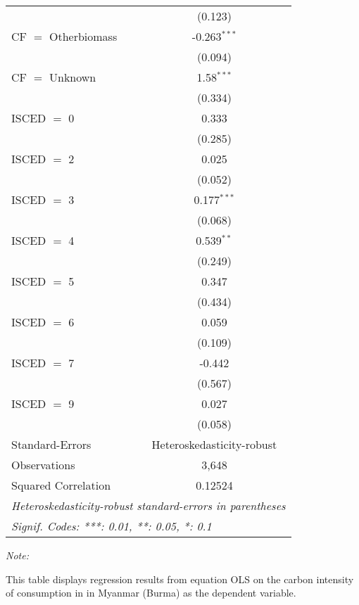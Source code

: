 \begin{table}[htbp!]
\begin{adjustbox}{width = 1\textwidth, max height = 0.95\textheight, center}
\begin{threeparttable}[b]
\begin{tabular}{lc}
                                & (0.123)\\   
            CF $=$ Otherbiomass & -0.263$^{***}$\\   
                                & (0.094)\\   
            CF $=$ Unknown      & 1.58$^{***}$\\   
                                & (0.334)\\   
            ISCED $=$ 0         & 0.333\\   
                                & (0.285)\\   
            ISCED $=$ 2         & 0.025\\   
                                & (0.052)\\   
            ISCED $=$ 3         & 0.177$^{***}$\\   
                                & (0.068)\\   
            ISCED $=$ 4         & 0.539$^{**}$\\   
                                & (0.249)\\   
            ISCED $=$ 5         & 0.347\\   
                                & (0.434)\\   
            ISCED $=$ 6         & 0.059\\   
                                & (0.109)\\   
            ISCED $=$ 7         & -0.442\\   
                                & (0.567)\\   
            ISCED $=$ 9         & 0.027\\   
                                & (0.058)\\   
            \midrule 
            Standard-Errors     & Heteroskedasticity-robust \\   
            Observations        & 3,648\\  
            Squared Correlation & 0.12524\\  
            \midrule \midrule
            \multicolumn{2}{l}{\emph{Heteroskedasticity-robust standard-errors in parentheses}}\\
            \multicolumn{2}{l}{\emph{Signif. Codes: ***: 0.01, **: 0.05, *: 0.1}}\\
         \end{tabular}
         
         \begin{tablenotes}\item \medskip \textit{Note:}
            \item This table displays regression results from equation OLS on the carbon intensity of consumption in  in Myanmar (Burma) as the dependent variable. 
         \end{tablenotes}
      \end{threeparttable}
   \end{adjustbox}
\end{table}


